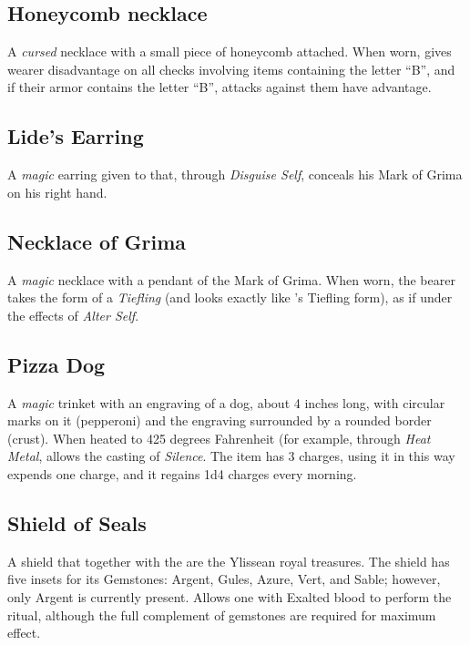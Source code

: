 \subsection{Honeycomb necklace}
\label{items:honeycomb}
A \textit{cursed} necklace with a small piece of honeycomb attached. When worn, gives wearer disadvantage on all checks involving items containing the letter ``B'', and if their armor contains the letter ``B'', attacks against them have advantage. 


\subsection{Lide's Earring}
\label{items:lideearring}
A \textit{magic} earring given to  that, through \textit{Disguise Self}, conceals his Mark of Grima on his right hand.

\subsection{Necklace of Grima}
\label{items:grimanecklace}
A \textit{magic} necklace with a pendant of the Mark of Grima. When worn, the bearer takes the form of a \textit{Tiefling} (and looks exactly like 's Tiefling form), as if under the effects of \textit{Alter Self}.

\subsection{Pizza Dog}
\label{items:pizzadog}
A \textit{magic} trinket with an engraving of a dog, about 4 inches long, with circular marks on it (pepperoni) and the engraving surrounded by a rounded border (crust). When heated to 425 degrees Fahrenheit (for example, through \textit{Heat Metal}, allows the casting of \textit{Silence}. The item has 3 charges, using it in this way expends one charge, and it regains 1d4 charges every morning.

\subsection{Shield of Seals}
\label{items:fireemblem}
A shield that together with the  are the Ylissean royal treasures. The shield has five insets for its Gemstones: Argent, Gules, Azure, Vert, and Sable; however, only Argent is currently present. Allows one with Exalted blood to perform the  ritual, although the full complement of gemstones are required for maximum effect.

